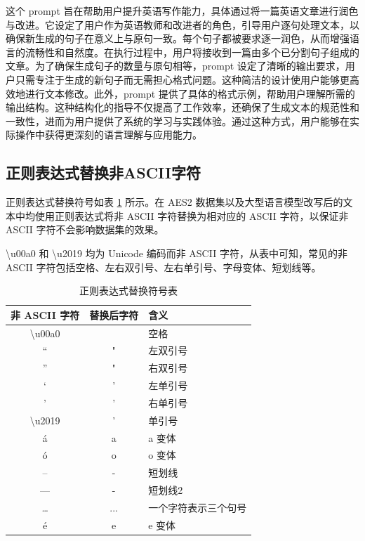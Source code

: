 这个 prompt 旨在帮助用户提升英语写作能力，具体通过将一篇英语文章进行润色与改进。它设定了用户作为英语教师和改进者的角色，引导用户逐句处理文本，以确保新生成的句子在意义上与原句一致。每个句子都被要求逐一润色，从而增强语言的流畅性和自然度。在执行过程中，用户将接收到一篇由多个已分割句子组成的文章。为了确保生成句子的数量与原句相等，prompt 设定了清晰的输出要求，用户只需专注于生成的新句子而无需担心格式问题。这种简洁的设计使用户能够更高效地进行文本修改。此外，prompt 提供了具体的格式示例，帮助用户理解所需的输出结构。这种结构化的指导不仅提高了工作效率，还确保了生成文本的规范性和一致性，进而为用户提供了系统的学习与实践体验。通过这种方式，用户能够在实际操作中获得更深刻的语言理解与应用能力。

\subsection{正则表达式替换非ASCII字符}
\label{sec:TOSWT-gen-reg}

正则表达式替换符号如表 \ref{tab:TOSWT-reg} 所示。在 AES2 数据集以及大型语言模型改写后的文本中均使用正则表达式将非 ASCII 字符替换为相对应的 ASCII 字符，以保证非 ASCII 字符不会影响数据集的效果。

\textbackslash{}u00a0 和 \textbackslash{}u2019 均为 Unicode 编码而非 ASCII 字符，从表中可知，常见的非 ASCII 字符包括空格、左右双引号、左右单引号、字母变体、短划线等。

\begin{table}[htbp]
    \centering
    \caption{正则表达式替换符号表} \label{tab:TOSWT-reg}
    \begin{tabular}{ccl}
    \toprule
    \textbf{非 ASCII 字符}   & \textbf{替换后字符} & \textbf{含义} \\ \midrule
    \textbackslash{}u00a0 & \              & 空格          \\
    “                     & "              & 左双引号        \\
    ”                     & "              & 右双引号        \\
    ‘                     & '              & 左单引号        \\
    ’                     & '              & 右单引号        \\
    \textbackslash{}u2019 & '              & 单引号         \\
    á                     & a              & a 变体       \\
    ó                     & o              & o 变体        \\
    –                     & -              & 短划线         \\
    —                     & -              & 短划线2        \\
    …                     & ...            & 一个字符表示三个句号  \\
    é                     & e              & e 变体         \\ \bottomrule
    \end{tabular}
\end{table}

